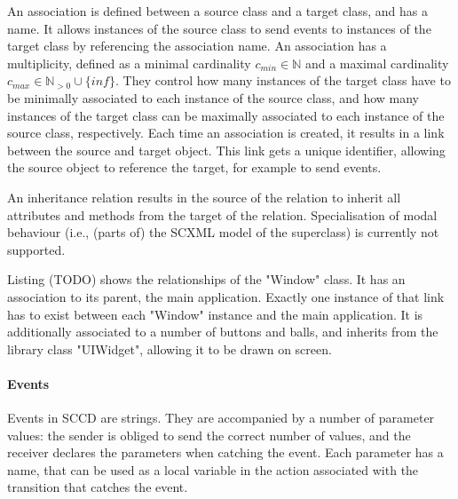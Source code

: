 An association is defined between a source class and a target class, and has a name. It allows instances of the source class 
to send events to instances of the target class by referencing the association name. An association has a multiplicity, 
defined as a minimal cardinality $c_{min} \in \mathbb{N}$ and a maximal cardinality $c_{max} \in \mathbb{N}_{>0} \cup \{inf\}$. 
They control how many instances of the target class have to be minimally associated to each instance of the source class, and 
how many instances of the target class can be maximally associated to each instance of the source class, respectively. Each 
time an association is created, it results in a link between the source and target object. This link gets a unique identifier, 
allowing the source object to reference the target, for example to send events.

An inheritance relation results in the source of the relation to inherit all attributes and methods from the target of the 
relation. Specialisation of modal behaviour (i.e., (parts of) the SCXML model of the superclass) is currently not supported.


Listing (TODO) shows the relationships of the "Window" class. It has an association to its parent, the main application. 
Exactly one instance of that link has to exist between each "Window" instance and the main application. It is additionally 
associated to a number of buttons and balls, and inherits from the library class "UIWidget", allowing it to be drawn on screen.

\paragraph{Events}
Events in SCCD are strings. They are accompanied by a number of parameter values: the sender is obliged to send the correct 
number of values, and the receiver declares the parameters when catching the event. Each parameter has a name, that can be used 
as a local variable in the action associated with the transition that catches the event.

